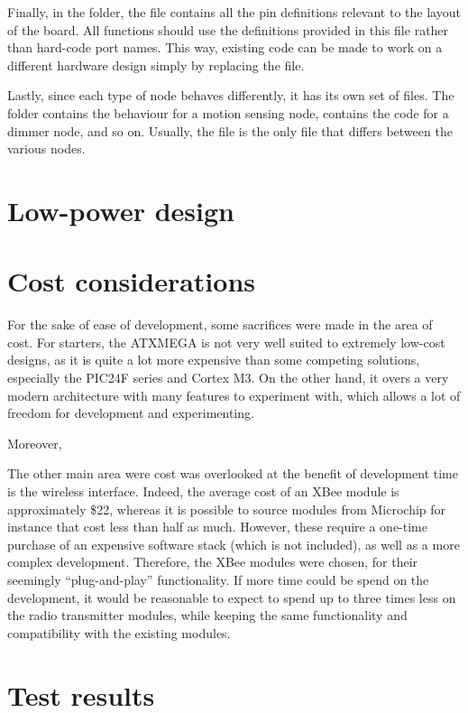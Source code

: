 Finally, in the  folder, the  file contains
all the pin definitions relevant to the layout of the board. All functions
should use the definitions provided in this file rather than hard-code port
names. This way, existing code can be made to work on a different hardware
design simply by replacing the  file.

Lastly, since each type of node behaves differently, it has its own set of
files. The  folder contains the behaviour for a motion
sensing node,  contains the code for a dimmer node, and so
on. Usually, the  file is the only file that differs between the
various nodes.

\section{Low-power design}

\section{Cost considerations}

For the sake of ease of development, some sacrifices were made in the area of
cost. For starters, the ATXMEGA is not very well suited to extremely low-cost
designs, as it is quite a lot more expensive than some competing solutions,
especially the PIC24F series and Cortex M3. On the other hand, it overs a very
modern architecture with many features to experiment with, which allows a lot of
freedom for development and experimenting.

Moreover,

The other main area were cost was overlooked at the benefit of development time
is the wireless interface. Indeed, the average cost of an XBee module is
approximately \$22, whereas it is possible to source modules from Microchip for
instance that cost less than half as much. However, these require a one-time
purchase of an expensive software stack (which is not included), as well as a
more complex development. Therefore, the XBee modules were chosen, for their
seemingly ``plug-and-play'' functionality. If more time could be spend on the
development, it would be reasonable to expect to spend up to three times less on
the radio transmitter modules, while keeping the same functionality and
compatibility with the existing modules.

\section{Test results}

